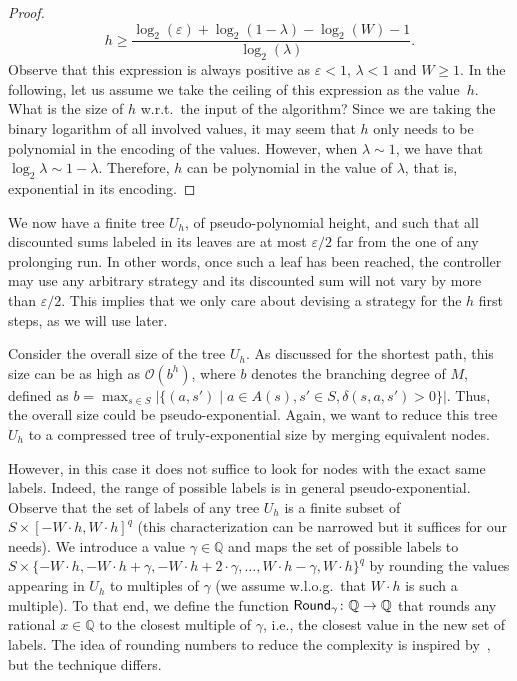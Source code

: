 \documentclass{llncs}
\newcommand{\states}{\ensuremath{S} }
\newcommand{\markovProcess}{\ensuremath{{M} }}
\newcommand{\discount}{\ensuremath{\lambda} }
\newcommand{\rat}{\ensuremath{\mathbb{Q}} }
\newcommand{\round}{\ensuremath{{\sf Round}_{\gamma}} }
\begin{document}
\begin{proof}
\begin{equation*}
h \geq \dfrac{\log_{2}(\varepsilon) + \log_{2}(1 - \discount) - \log_{2}(W) - 1}{\log_{2}(\discount)}.
\end{equation*}
Observe that this expression is always positive as $\varepsilon < 1$, $\discount < 1$ and $W \geq 1$. In the following, let us assume we take the ceiling of this expression as the value~$h$. What is the size of $h$ w.r.t.~the input of the algorithm? Since we are taking the binary logarithm of all involved values, it may seem that $h$ only needs to be polynomial in the encoding of the values. However, when $\discount \sim 1$, we have that $\log_{2} \discount \sim 1 - \discount$. Therefore, $h$ can be polynomial in the value of $\discount$, that is, exponential in its encoding.
\end{proof}

We now have a finite tree $U_{h}$, of pseudo-polynomial height, and such that all discounted sums labeled in its leaves are at most $\varepsilon/2$ far from the one of any prolonging run. In other words, once such a leaf has been reached, the controller may use any arbitrary strategy and its discounted sum will not vary by more than $\varepsilon/2$. This implies that we only care about devising a strategy for the $h$ first steps, as we will use later.

Consider the overall size of the tree $U_{h}$. As discussed for the shortest path, this size can be as high as $\mathcal{O}(b^{h})$, where $b$ denotes the branching degree of $\markovProcess$, defined as $b = \max_{s \in \states} \big\vert \{(a, s') \mid a \in A(s), s' \in \states, \delta(s,a,s') > 0\} \big\vert$. Thus, the overall size could be pseudo-exponential. Again, we want to reduce this tree $U_{h}$ to a compressed tree of truly-exponential size by merging equivalent nodes.

However, in this case it does not suffice to look for nodes with the exact same labels. Indeed, the range of possible labels is in general pseudo-exponential. Observe that the set of labels of any tree $U_{h}$ is a finite subset of $\states \times \left[ -W \cdot h, W \cdot h\right]^{q}$ (this characterization can be narrowed but it suffices for our needs). We introduce a value $\gamma \in \rat$ and maps the set of possible labels to $\states \times \{-W \cdot h, -W\cdot h + \gamma,  -W\cdot h + 2\cdot\gamma, \ldots{}, W\cdot h - \gamma, W \cdot h\}^{q}$ by rounding the values appearing in $U_{h}$ to multiples of $\gamma$ (we assume w.l.o.g.~that $W\cdot h$ is such a multiple). To that end, we define the function $\round\colon \rat \rightarrow \rat$ that rounds any rational $x \in \rat$ to the closest multiple of $\gamma$, i.e., the closest value in the new set of labels. The idea of rounding numbers to reduce the complexity is inspired by~\cite{DBLP:conf/fsttcs/BrazdilCFNS13}, but the technique differs.
\end{document}
